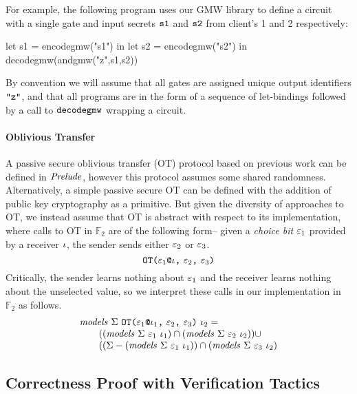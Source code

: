 For example, the following program uses our GMW library to define
a circuit with a single \eand gate and input secrets $\texttt{s1}$ and
$\texttt{s2}$ from client's 1 and 2 respectively:
\begin{verbatimtab}
         let s1 = encodegmw("s1") in
         let s2 = encodegmw("s2") in
         decodegmw(andgmw("z",s1,s2))
\end{verbatimtab}
By convention we will assume that all gates are assigned unique output
identifiers $\texttt{"z"}$, and that all programs are in the form
of a sequence of let-bindings followed by a call to $\texttt{decodegmw}$
wrapping a circuit.

\paragraph{Oblivious Transfer} A passive secure oblivious transfer (OT) protocol
based on previous work \cite{XXX} can be defined in $\mathit{Prelude}$,
however this protocol assumes some shared randomness. Alternatively,
a simple passive secure OT can be defined with the addition of
public key cryptography as a primitive. But given the diversity
of approaches to OT, we instead assume that OT is abstract with
respect to its implementation, where calls to OT in $\mathbb{F}_2$
are of the following form-- given a \emph{choice bit}
$\varepsilon_1$ provided by a receiver $\iota$, the sender
sends either $\varepsilon_2$ or $\varepsilon_3$.
$$
\texttt{OT(} \varepsilon_1\texttt{@}\iota \texttt{,}\ \varepsilon_2 \texttt{,}\ \varepsilon_3 \texttt{)}
$$
Critically, the sender learns nothing about $\varepsilon_1$ and the
receiver learns nothing about the unselected value, so we interpret
these calls in our implementation in $\mathbb{F}_2$ as follows.
$$
\begin{array}{l}
\mathit{models}\ \Sigma\ \texttt{OT(} \varepsilon_1\texttt{@}\iota_1 \texttt{,}\ \varepsilon_2 \texttt{,}\ \varepsilon_3 \texttt{)}\ \iota_2 = \\
\qquad ((\mathit{models}\ \Sigma\ \varepsilon_1\ \iota_1) \cap 
(\mathit{models}\ \Sigma\ \varepsilon_2\ \iota_2)) \cup \\
\qquad ((\Sigma - (\mathit{models}\ \Sigma\ \varepsilon_1\ \iota_1)) \cap
(\mathit{models}\ \Sigma\ \varepsilon_3\ \iota_2)
\end{array}
$$

\subsection{Correctness Proof with Verification Tactics}

